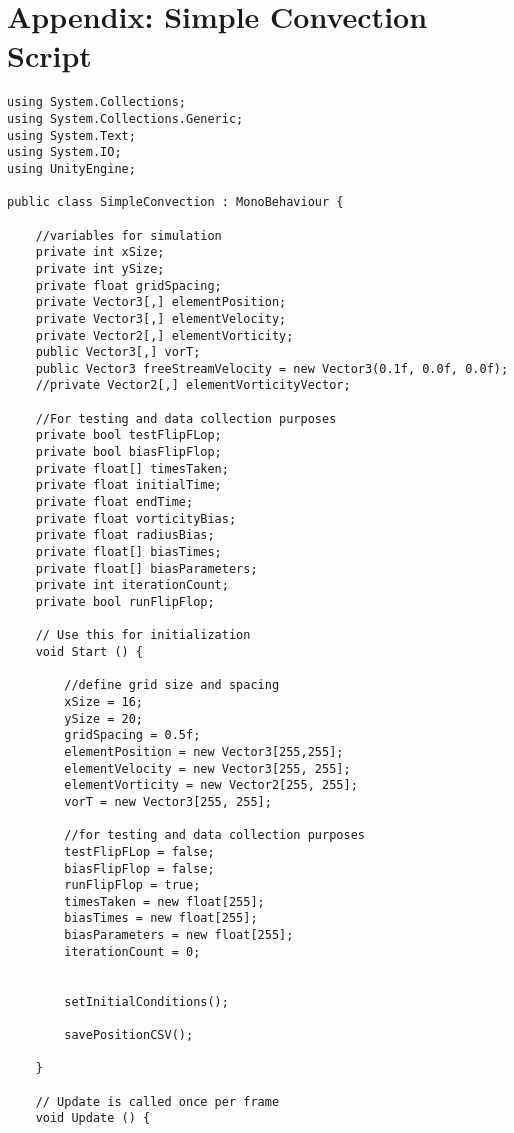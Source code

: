 \section{Appendix: Simple Convection Script}

\begin{mdframed}[linecolor=black, topline=true, bottomline=true,
  leftline=false, rightline=false]
\begin{verbatim}
using System.Collections;
using System.Collections.Generic;
using System.Text;
using System.IO;
using UnityEngine;

public class SimpleConvection : MonoBehaviour {

    //variables for simulation
    private int xSize;
    private int ySize;
    private float gridSpacing;
    private Vector3[,] elementPosition;
    private Vector3[,] elementVelocity;
    private Vector2[,] elementVorticity;
    public Vector3[,] vorT;
    public Vector3 freeStreamVelocity = new Vector3(0.1f, 0.0f, 0.0f);
    //private Vector2[,] elementVorticityVector;

    //For testing and data collection purposes
    private bool testFlipFLop;
    private bool biasFlipFlop;
    private float[] timesTaken;
    private float initialTime;
    private float endTime;
    private float vorticityBias;
    private float radiusBias;
    private float[] biasTimes;
    private float[] biasParameters;
    private int iterationCount;
    private bool runFlipFlop;

	// Use this for initialization
	void Start () {

        //define grid size and spacing
        xSize = 16;
        ySize = 20;
        gridSpacing = 0.5f;
        elementPosition = new Vector3[255,255];
        elementVelocity = new Vector3[255, 255];
        elementVorticity = new Vector2[255, 255];
        vorT = new Vector3[255, 255];

        //for testing and data collection purposes
        testFlipFLop = false;
        biasFlipFlop = false;
        runFlipFlop = true;
        timesTaken = new float[255];
        biasTimes = new float[255];
        biasParameters = new float[255];
        iterationCount = 0;
        

        setInitialConditions();

        savePositionCSV();

    }
	
	// Update is called once per frame
	void Update () {
		

\end{verbatim}
\end{mdframed}
